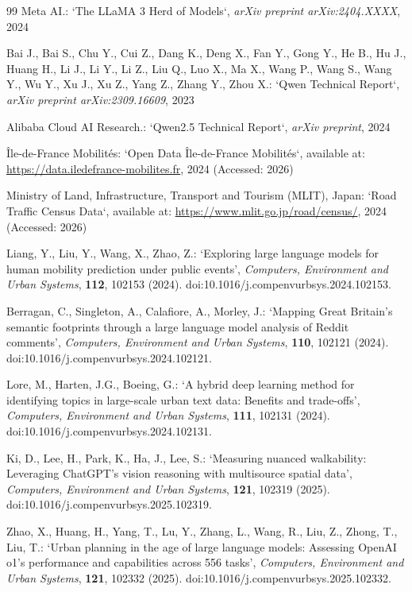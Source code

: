 \documentclass[a4paper,fleqn]{cas-sc}
\begin{document}
\begin{thebibliography}{99}
Meta AI.:  
`The LLaMA 3 Herd of Models`, \textit{arXiv preprint arXiv:2404.XXXX}, 2024

Bai J., Bai S., Chu Y., Cui Z., Dang K., Deng X., Fan Y., Gong Y., He B., Hu J., Huang H., Li J., Li Y., Li Z., Liu Q., Luo X., Ma X., Wang P., Wang S., Wang Y., Wu Y., Xu J., Xu Z., Yang Z., Zhang Y., Zhou X.:  
`Qwen Technical Report`, \textit{arXiv preprint arXiv:2309.16609}, 2023

Alibaba Cloud AI Research.:  
`Qwen2.5 Technical Report`, \textit{arXiv preprint}, 2024

Île-de-France Mobilités:  
`Open Data Île-de-France Mobilités`, available at: \url{https://data.iledefrance-mobilites.fr}, 2024 (Accessed: 2026)

Ministry of Land, Infrastructure, Transport and Tourism (MLIT), Japan:  
`Road Traffic Census Data`, available at: \url{https://www.mlit.go.jp/road/census/}, 2024 (Accessed: 2026)



Liang, Y., Liu, Y., Wang, X., Zhao, Z.:
`Exploring large language models for human mobility prediction under public events',
\textit{Computers, Environment and Urban Systems}, \textbf{112}, 102153 (2024).
doi:10.1016/j.compenvurbsys.2024.102153.

Berragan, C., Singleton, A., Calafiore, A., Morley, J.:
`Mapping Great Britain's semantic footprints through a large language model analysis of Reddit comments',
\textit{Computers, Environment and Urban Systems}, \textbf{110}, 102121 (2024).
doi:10.1016/j.compenvurbsys.2024.102121.

Lore, M., Harten, J.G., Boeing, G.:
`A hybrid deep learning method for identifying topics in large-scale urban text data: Benefits and trade-offs',
\textit{Computers, Environment and Urban Systems}, \textbf{111}, 102131 (2024).
doi:10.1016/j.compenvurbsys.2024.102131.

Ki, D., Lee, H., Park, K., Ha, J., Lee, S.:
`Measuring nuanced walkability: Leveraging ChatGPT's vision reasoning with multisource spatial data',
\textit{Computers, Environment and Urban Systems}, \textbf{121}, 102319 (2025).
doi:10.1016/j.compenvurbsys.2025.102319.

Zhao, X., Huang, H., Yang, T., Lu, Y., Zhang, L., Wang, R., Liu, Z., Zhong, T., Liu, T.:
`Urban planning in the age of large language models: Assessing OpenAI o1's performance and capabilities across 556 tasks',
\textit{Computers, Environment and Urban Systems}, \textbf{121}, 102332 (2025).
doi:10.1016/j.compenvurbsys.2025.102332.

\end{thebibliography}
\end{document}
